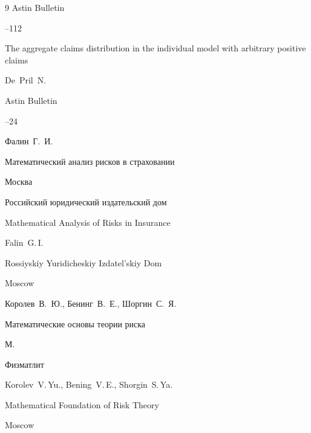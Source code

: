\begin{thebibliography}{9}
\jour Astin Bulletin




--112




\paper The aggregate claims distribution in the individual model with arbitrary positive claims

\by De~Pril~N.

\jour Astin Bulletin




--24




\by Фалин~Г.~И.

\book  Математический анализ рисков в страховании

\publaddr Москва

\publ Российский юридический издательский дом



\misctransl

\book Mathematical Analysis of Risks in Insurance

\by Falin~G.\,I.



\publ Rossiyskiy Yuridicheskiy Izdatel'skiy Dom 

\publaddr Moscow




\by Королев~В.~Ю., Бенинг~В.~Е., Шоргин~С.~Я.

\book  Математические основы теории риска

\publaddr М.

\publ Физматлит



\misctransl

\by Korolev~V.\,Yu., Bening~V.\,E., Shorgin~S.\,Ya.

\book Mathematical Foundation of Risk Theory

\publaddr Moscow


\end{thebibliography}
